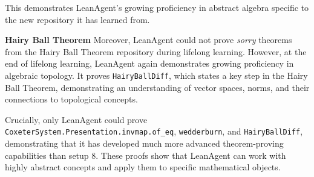 \documentclass{article} %
\begin{document}
This demonstrates LeanAgent's growing proficiency in abstract algebra specific to the new repository it has learned from.

\textbf{Hairy Ball Theorem} Moreover, LeanAgent could not prove \textit{sorry} theorems from the Hairy Ball Theorem repository during lifelong learning. However, at the end of lifelong learning, LeanAgent again demonstrates growing proficiency in algebraic topology. It proves \texttt{HairyBallDiff}, which states a key step in the Hairy Ball Theorem, demonstrating an understanding of vector spaces, norms, and their connections to topological concepts.

Crucially, only LeanAgent could prove \texttt{CoxeterSystem.Presentation.invmap.of\_eq}, \texttt{wedderburn}, and \texttt{HairyBallDiff}, demonstrating that it has developed much more advanced theorem-proving capabilities than setup 8. These proofs show that LeanAgent can work with highly abstract concepts and apply them to specific mathematical objects.












\end{document}
